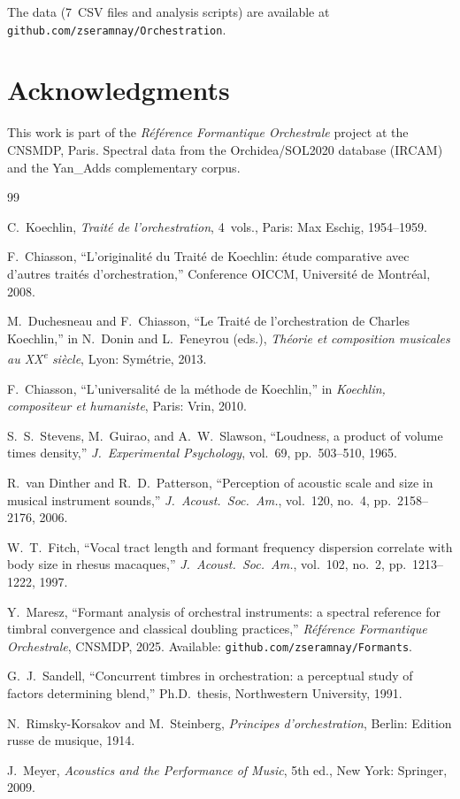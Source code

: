 \documentclass[journal]{IEEEtran}
\begin{document}
The data (7~CSV files and analysis scripts) are available at \texttt{github.com/zseramnay/Orchestration}.

\section*{Acknowledgments}
This work is part of the \textit{Référence Formantique Orchestrale} project at the CNSMDP, Paris. Spectral data from the Orchidea/SOL2020 database (IRCAM) and the Yan\_Adds complementary corpus.

\begin{thebibliography}{99}

C.~Koechlin, \textit{Traité de l'orchestration}, 4~vols., Paris: Max Eschig, 1954--1959.

F.~Chiasson, ``L'originalité du Traité de Koechlin: étude comparative avec d'autres traités d'orchestration,'' Conference OICCM, Université de Montréal, 2008.

M.~Duchesneau and F.~Chiasson, ``Le Traité de l'orchestration de Charles Koechlin,'' in N.~Donin and L.~Feneyrou (eds.), \textit{Théorie et composition musicales au XX\textsuperscript{e} siècle}, Lyon: Symétrie, 2013.

F.~Chiasson, ``L'universalité de la méthode de Koechlin,'' in \textit{Koechlin, compositeur et humaniste}, Paris: Vrin, 2010.

S.~S.~Stevens, M.~Guirao, and A.~W.~Slawson, ``Loudness, a product of volume times density,'' \textit{J.~Experimental Psychology}, vol.~69, pp.~503--510, 1965.

R.~van Dinther and R.~D.~Patterson, ``Perception of acoustic scale and size in musical instrument sounds,'' \textit{J.~Acoust.~Soc.~Am.}, vol.~120, no.~4, pp.~2158--2176, 2006.

W.~T.~Fitch, ``Vocal tract length and formant frequency dispersion correlate with body size in rhesus macaques,'' \textit{J.~Acoust.~Soc.~Am.}, vol.~102, no.~2, pp.~1213--1222, 1997.

Y.~Maresz, ``Formant analysis of orchestral instruments: a spectral reference for timbral convergence and classical doubling practices,'' \textit{Référence Formantique Orchestrale}, CNSMDP, 2025. Available: \texttt{github.com/zseramnay/Formants}.

G.~J.~Sandell, ``Concurrent timbres in orchestration: a perceptual study of factors determining blend,'' Ph.D.\ thesis, Northwestern University, 1991.

N.~Rimsky-Korsakov and M.~Steinberg, \textit{Principes d'orchestration}, Berlin: Edition russe de musique, 1914.

J.~Meyer, \textit{Acoustics and the Performance of Music}, 5th ed., New York: Springer, 2009.

\end{thebibliography}
\end{document}
